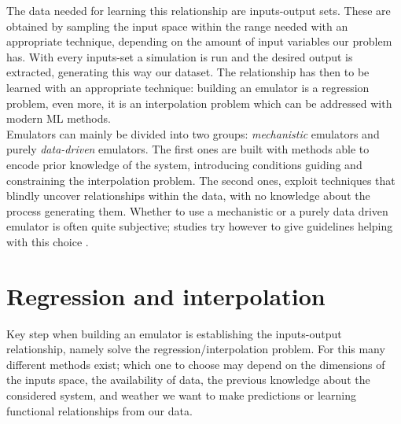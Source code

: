 The data needed for learning this relationship are inputs-output sets.
These are obtained by sampling the input space within the range needed with an appropriate technique, depending on the amount of input variables our problem has.
With every inputs-set a simulation is run and the desired output is extracted, generating this way our dataset.
The relationship has then to be learned with an appropriate technique: building an emulator is a regression problem, even more, it is an interpolation problem \autocite{carbajal_emumore_2017} which can be addressed with modern ML methods.\\

Emulators can mainly be divided into two groups: \emph{mechanistic} emulators and purely \emph{data-driven} emulators.
The first ones are built with methods able to encode prior knowledge of the system, introducing conditions guiding and constraining the interpolation problem.
The second ones, exploit techniques that blindly uncover relationships within the data, with no knowledge about the process generating them.
Whether to use a mechanistic or a purely data driven emulator is often quite subjective; studies try however to give guidelines helping with this choice \autocite{carbajal_appraisal_2016}.



\section{Regression and interpolation}


Key step when building an emulator is establishing the inputs-output relationship, namely solve the regression/interpolation problem.
For this many different methods exist; which one to choose may depend on the dimensions of the inputs space, the availability of data, the previous knowledge about the considered system, and weather we want to make predictions or learning functional relationships from our data.\\

